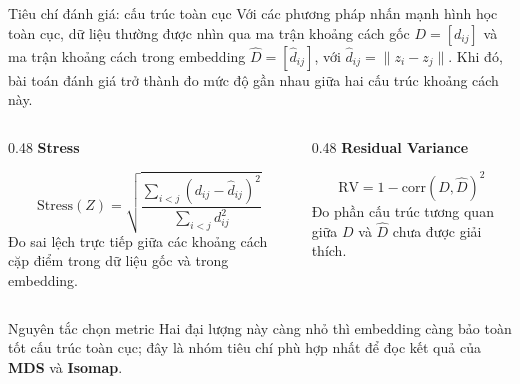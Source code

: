\begin{frame}[shrink=7]{Tiêu chí đánh giá: cấu trúc toàn cục}
    Với các phương pháp nhấn mạnh hình học toàn cục, dữ liệu thường được nhìn qua ma trận khoảng cách gốc $D=[d_{ij}]$ và ma trận khoảng cách trong embedding $\hat D=[\hat d_{ij}]$, với $\hat d_{ij}=\|z_i-z_j\|$. Khi đó, bài toán đánh giá trở thành đo mức độ gần nhau giữa hai cấu trúc khoảng cách này.

    \vspace{0.2cm}
    \begin{columns}[T,onlytextwidth]
        \begin{column}{0.48\textwidth}
            {\bfseries Stress}

            \[
                \mathrm{Stress}(Z)=
                \sqrt{\frac{\sum_{i<j}(d_{ij}-\hat d_{ij})^2}{\sum_{i<j} d_{ij}^2}}
            \]
            {\small Đo sai lệch trực tiếp giữa các khoảng cách cặp điểm trong dữ liệu gốc và trong embedding.}
        \end{column}

        \begin{column}{0.48\textwidth}
            {\bfseries Residual Variance}

            \[
                \mathrm{RV}=1-\mathrm{corr}(D,\hat D)^2
            \]
            {\small Đo phần cấu trúc tương quan giữa $D$ và $\hat D$ chưa được giải thích.}
        \end{column}
    \end{columns}

    \vspace{0.12cm}
    \begin{block}{Nguyên tắc chọn metric}
        \small
        Hai đại lượng này càng nhỏ thì embedding càng bảo toàn tốt cấu trúc toàn cục; đây là nhóm tiêu chí phù hợp nhất để đọc kết quả của \textbf{MDS} và \textbf{Isomap}.
    \end{block}
\end{frame}


